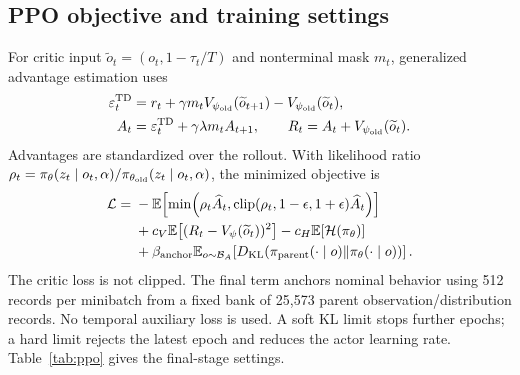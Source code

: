 \subsection{PPO objective and training settings}
For critic input $\widetilde o_t=(o_t,1-\tau_t/T)$ and nonterminal mask $m_t$, generalized advantage estimation uses
\begin{align}
 \varepsilon_t^{\rm TD}&=r_t+\gamma m_tV_{\psi_{\rm old}}(\widetilde o_{t+1})
             -V_{\psi_{\rm old}}(\widetilde o_t),\\
 A_t&=\varepsilon_t^{\rm TD}+\gamma\lambda m_tA_{t+1},\qquad
 R_t=A_t+V_{\psi_{\rm old}}(\widetilde o_t).
\end{align}
Advantages are standardized over the rollout. With likelihood ratio $\rho_t=\pi_\theta(z_t\mid o_t,\alpha)/\pi_{\theta_{\rm old}}(z_t\mid o_t,\alpha)$, the minimized objective is
\begin{equation}
\begin{split}
\mathcal L={}&-\mathbb E\!\left[\min\!\left(\rho_t\widehat A_t,
 \operatorname{clip}(\rho_t,1-\epsilon,1+\epsilon)\widehat A_t\right)\right]\\
 &+c_V\mathbb E\!\left[(R_t-V_\psi(\widetilde o_t))^2\right]
 -c_H\mathbb E[\mathcal H(\pi_\theta)]\\
 &+\beta_{\rm anchor}\mathbb E_{o\sim\mathcal B_A}\!\left[D_{\rm KL}(\pi_{\rm parent}(\cdot\mid o)\Vert\pi_\theta(\cdot\mid o))\right].
\end{split}
\label{eq:ppo}
\end{equation}
The critic loss is not clipped. The final term anchors nominal behavior using 512 records per minibatch from a fixed bank of 25,573 parent observation/distribution records. No temporal auxiliary loss is used. A soft KL limit stops further epochs; a hard limit rejects the latest epoch and reduces the actor learning rate. Table~\ref{tab:ppo} gives the final-stage settings.

